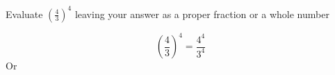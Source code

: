 \question Evaluate $\left( \frac{4}{3} \right)^{4}$ leaving your answer as a
proper fraction or a whole number
\begin{solution}
	\[
		\left( \frac{4}{3} \right)^{4} 
		=
		\frac{4^{4}}{3^{4}} 
	\]
	Or
\end{solution}

